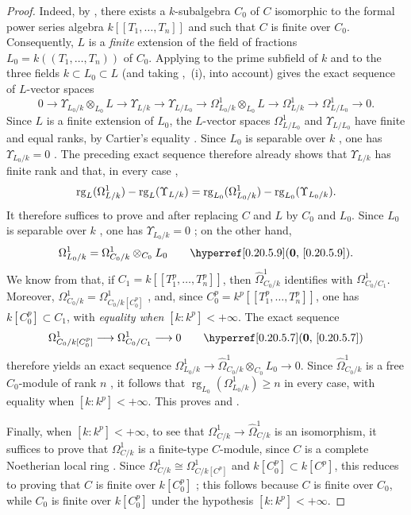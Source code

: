 \begin{proof}
Indeed, by , there exists a $k$-subalgebra $C_0$ of $C$ isomorphic to the formal power series algebra $k[[T_1,\ldots,T_n]]$ and such that $C$ is finite over $C_0$.
Consequently, $L$ is a \emph{finite} extension of the field of fractions $L_0=k((T_1,\ldots,T_n))$ of $C_0$.
Applying  to the prime subfield of $k$ and to the three fields $k\subset L_0\subset L$ (and taking ,~(i), into account) gives the exact sequence of $L$-vector spaces
\[
  0\to\Upsilon_{L_0/k}\otimes_{L_0}L\to\Upsilon_{L/k}\to\Upsilon_{L/L_0}\to\Omega^1_{L_0/k}\otimes_{L_0}L\to\Omega^1_{L/k}\to\Omega^1_{L/L_0}\to 0.
\]
Since $L$ is a finite extension of $L_0$, the $L$-vector spaces $\Omega^1_{L/L_0}$ and $\Upsilon_{L/L_0}$ have finite and equal ranks, by Cartier's equality . Since $L_0$ is separable over $k$ , one has $\Upsilon_{L_0/k}=0$ . The preceding exact sequence therefore already shows that $\Upsilon_{L/k}$ has finite rank and that, in every case ,
\[
  \operatorname{rg}_{L}(\Omega^1_{L/k})-\operatorname{rg}_{L}(\Upsilon_{L/k})=\operatorname{rg}_{L_0}(\Omega^1_{L_0/k})-\operatorname{rg}_{L_0}(\Upsilon_{L_0/k}).
\]
It therefore suffices to prove  and  after replacing $C$ and $L$ by $C_0$ and $L_0$. Since $L_0$ is separable over $k$ , one has $\Upsilon_{L_0/k}=0$ ; on the other hand,
\[
  \Omega^1_{L_0/k}=\Omega^1_{C_0/k}\otimes_{C_0}L_0
  \qquad\text{\sref[0]{0.20.5.9}.}
\]
We know from  that, if $C_1=k[[T_1^p,\ldots,T_n^p]]$, then $\hat{\Omega}^1_{C_0/k}$ identifies with $\Omega^1_{C_0/C_1}$. Moreover,
$\Omega^1_{C_0/k}=\Omega^1_{C_0/k[C_0^p]}$ , and, since $C_0^p=k^p[[T_1^p,\ldots,T_n^p]]$, one has $k[C_0^p]\subset C_1$, with \emph{equality when} $[k:k^p]<+\infty$. The exact sequence
\[
  \Omega^1_{C_0/k[C_0^p]}\longrightarrow\Omega^1_{C_0/C_1}\longrightarrow 0
  \qquad\text{\sref[0]{0.20.5.7}}
\]
therefore yields an exact sequence $\Omega^1_{L_0/k}\to\hat{\Omega}^1_{C_0/k}\otimes_{C_0}L_0\to0$. Since $\hat{\Omega}^1_{C_0/k}$ is a free $C_0$-module of rank $n$ , it follows that $\operatorname{rg}_{L_0}(\Omega^1_{L_0/k})\geq n$ in every case, with equality when $[k:k^p]<+\infty$. This proves  and .

Finally, when $[k:k^p]<+\infty$, to see that $\Omega^1_{C/k}\to\hat{\Omega}^1_{C/k}$ is an isomorphism, it suffices to prove that $\Omega^1_{C/k}$ is a finite-type $C$-module, since $C$ is a complete Noetherian local ring . Since $\Omega^1_{C/k}\cong\Omega^1_{C/k[C^p]}$ and $k[C_0^p]\subset k[C^p]$, this reduces to proving that $C$ is finite over $k[C_0^p]$ ; this follows because $C$ is finite over $C_0$, while $C_0$ is finite over $k[C_0^p]$ under the hypothesis $[k:k^p]<+\infty$.
\end{proof}

